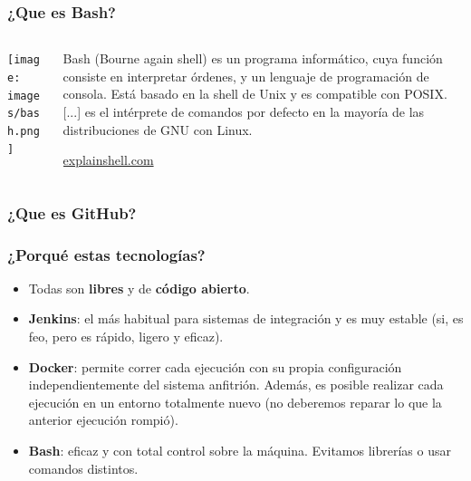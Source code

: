\documentclass[
xcolor={svgnames},
hyperref={colorlinks,citecolor=DeepPink4,linkcolor=Black,urlcolor=DarkBlue}
]{beamer}
\begin{document}

\begin{frame}
	\frametitle{¿Que es Bash?}
	\begin{columns}[t] 
	\begin{column}{0.2\textwidth}
		\begin{center}
			\texttt{[image: images/bash.png]}
			
		\end{center}
	\end{column}
	\begin{column}{0.7\textwidth}
		\begin{block}{}
			Bash (Bourne again shell) es un programa informático, cuya función consiste en interpretar órdenes, y un lenguaje de programación de consola. Está basado en la shell de Unix y es compatible con POSIX.
			[...] es el intérprete de comandos por defecto en la mayoría de las distribuciones de GNU con Linux.
					\nocite{wiki:bash}
		\end{block}
		\begin{center}
			\href{http://explainshell.com}{explainshell.com}
		\end{center}
	\end{column}
\end{columns}
\end{frame}

\begin{frame}
	\frametitle{¿Que es GitHub?}
\end{frame}

\begin{frame}
	\frametitle{¿Porqué estas tecnologías?}
	\begin{itemize}
		\item<1->{Todas son \textbf{libres} y de \textbf{código abierto}.}
		
		\item<2->{\textbf{Jenkins}: el más habitual para sistemas de integración y es muy estable (si, es feo, pero es rápido, ligero y eficaz).}
		
		\item<3->{\textbf{Docker}: permite correr cada ejecución con su propia configuración independientemente del sistema anfitrión. Además, es posible realizar cada ejecución en un entorno totalmente nuevo (no deberemos reparar lo que la anterior ejecución rompió).}
		
		\item<4->{\textbf{Bash}: eficaz y con total control sobre la máquina. Evitamos librerías o usar comandos distintos.}
	\end{itemize}
\end{frame}
\end{document}
